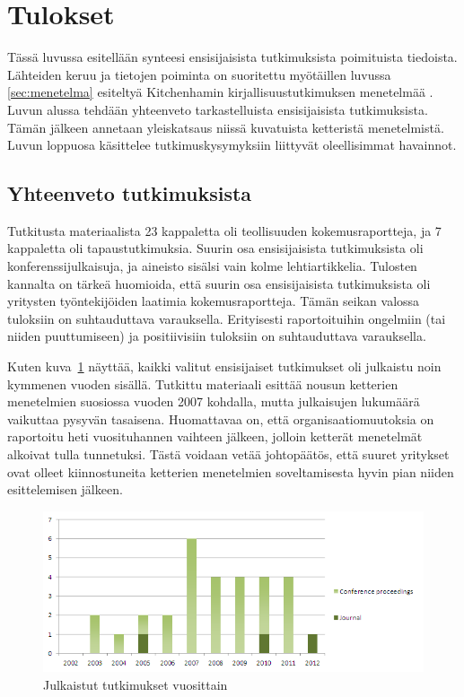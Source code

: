 \clearpage
\section{Tulokset}
\label{sec:tulokset}

Tässä luvussa esitellään synteesi ensisijaisista tutkimuksista poimituista
tiedoista. Lähteiden keruu ja tietojen poiminta on suoritettu myötäillen luvussa
\ref{sec:menetelma} esiteltyä Kitchenhamin kirjallisuustutkimuksen menetelmää
. Luvun alussa tehdään yhteenveto tarkastelluista
ensisijaisista tutkimuksista. Tämän jälkeen annetaan yleiskatsaus niissä
kuvatuista ketteristä menetelmistä. Luvun loppuosa käsittelee
tutkimuskysymyksiin liittyvät oleellisimmat havainnot.

\subsection{Yhteenveto tutkimuksista}

Tutkitusta materiaalista 23 kappaletta oli teollisuuden kokemusraportteja, ja 7
kappaletta oli tapaustutkimuksia. Suurin osa ensisijaisista tutkimuksista oli
konferenssijulkaisuja, ja aineisto sisälsi vain kolme lehtiartikkelia. Tulosten
kannalta on tärkeä huomioida, että suurin osa ensisijaisista tutkimuksista oli
yritysten työntekijöiden laatimia kokemusraportteja. Tämän seikan valossa
tuloksiin on suhtauduttava varauksella. Erityisesti raportoituihin ongelmiin
(tai niiden puuttumiseen) ja positiivisiin tuloksiin on suhtauduttava
varauksella.

Kuten kuva~\ref{fig:publications} näyttää, kaikki valitut ensisijaiset
tutkimukset oli julkaistu noin kymmenen vuoden sisällä. Tutkittu materiaali
esittää nousun ketterien menetelmien suosiossa vuoden 2007 kohdalla, mutta
julkaisujen lukumäärä vaikuttaa pysyvän tasaisena. Huomattavaa on, että
organisaatiomuutoksia on raportoitu heti vuosituhannen vaihteen jälkeen, jolloin
ketterät menetelmät alkoivat tulla tunnetuksi. Tästä voidaan vetää johtopäätös,
että suuret yritykset ovat olleet kiinnostuneita ketterien menetelmien
soveltamisesta hyvin pian niiden esittelemisen jälkeen.

\begin{figure}[htb]
  \begin{center}
    \includegraphics[width=1\textwidth]{img/Publications}
    \caption{Julkaistut tutkimukset vuosittain}
    \label{fig:publications}
  \end{center}
\end{figure}

